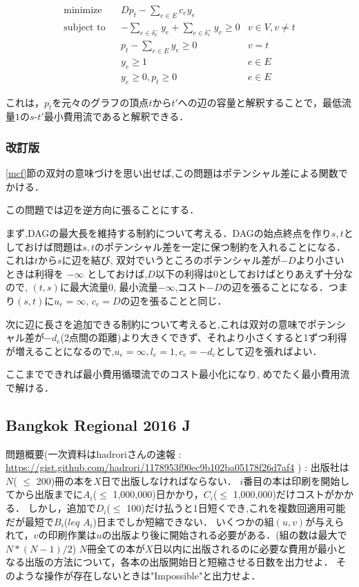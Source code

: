 \documentclass[13pt]{jarticle}
\theoremstyle{nonitalic} %
\begin{document}
\begin{align}
  &&&&& \textrm{minimize}   && Dp_t - \sum_{e \in E} c_e y_e \\
  &&&&& \textrm{subject to} && -\sum_{e \in \delta_v^- } y_e + \sum_{e \in \delta_v^+ } y_e \geq 0 & v \in V, v\neq t &&&&&\\
  &&&&&                     && p_t - \sum_{e \in E} y_e \geq 0 & v=t \\
  &&&&&                     && y_e \geq 1  & e \in E\\
  &&&&&                     && y_e \geq 0, p_t \geq 0 & e\in E
\end{align}


これは，$p_t$を元々のグラフの頂点$t$から$t'$への辺の容量と解釈することで，最低流量$1$の$s$-$t'$最小費用流であると解釈できる．

\subsubsection{改訂版}
\ref{mcf}節の双対の意味づけを思い出せば,この問題はポテンシャル差による関数でかける．

この問題では辺を逆方向に張ることにする．

まず,DAGの最大長を維持する制約について考える．DAGの始点終点を作り$s,t$としておけば問題は$s,t$のポテンシャル差を一定に保つ制約を入れることになる．これは$t$から$s$に辺を結び, 双対でいうところのポテンシャル差が$-D$より小さいときは利得を $-\infty$ としておけば,$D$以下の利得は0としておけばとりあえず十分なので,
$(t,s)$に最大流量0, 最小流量$-\infty$,コスト$-D$の辺を張ることになる．つまり$(s,t)$に$u_e = \infty$, $c_e=D$の辺を張ることと同じ．

次に辺に長さを追加できる制約について考えると,これは双対の意味でポテンシャル差が$-d_e$(2点間の距離)より大きくできず、それより小さくすると1ずつ利得が増えることになるので,$u_e = \infty, l_e=1, c_e = -d_e $として辺を張ればよい．

ここまでできれば最小費用循環流でのコスト最小化になり, めでたく最小費用流で解ける．

\subsection{Bangkok Regional 2016 J }
問題概要(一次資料はhadroriさんの速報 : \url{https://gist.github.com/hadrori/1178953f90ec9b102ba05178f26d7af4} ) : 
出版社は$N$( $\leq$ 200)冊の本を$X$日で出版しなければならない．
$i$番目の本は印刷を開始してから出版までに$A_i$($\leq$ 1,000,000)日かかり，$C_i$($\leq$ 1,000,000)だけコストがかかる．
しかし，追加で$D_i$($\leq$ 100)だけ払うと1日短くでき,これを複数回適用可能だが最短で$B_i$($leq$ $A_i$)日までしか短縮できない．
いくつかの組$(u,v)$が与えられて，$v$の印刷作業は$u$の出版より後に開始される必要がある．(組の数は最大で$N*(N-1)/2$)
$N$冊全ての本が$X$日以内に出版されるのに必要な費用が最小となる出版の方法について，各本の出版開始日と短縮させる日数を出力せよ．
そのような操作が存在しないときは"Impossible"と出力せよ．
\end{document}
